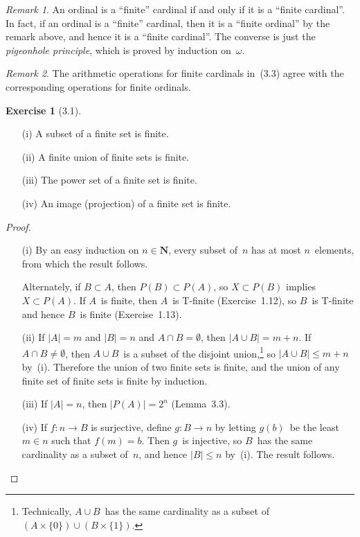 \documentclass[letterpaper,12pt]{article}
\newcommand{\N}{\boldsymbol{N}}
\renewcommand{\P}{P}
\newcommand{\union}{\cup}
\newcommand{\sect}{\cap}
\newcommand{\card}[1]{|#1|}
\theoremstyle{definition}
\newtheorem*{exer}{Exercise}
\theoremstyle{remark}
\newtheorem*{rmk}{Remark}
\begin{document}
\begin{rmk}
An ordinal is a ``finite'' cardinal if and only if it is a ``finite cardinal''. In fact, if an ordinal is a ``finite'' cardinal, then it is a ``finite ordinal'' by the remark above, and hence it is a ``finite cardinal''. The converse is just the \emph{pigeonhole principle}, which is proved by induction on~\(\omega\).
\end{rmk}

\begin{rmk}
The arithmetic operations for finite cardinals in~(3.3) agree with the corresponding operations for finite ordinals.
\end{rmk}

\begin{exer}[3.1]\
\begin{enumerate}[itemsep=0pt]
\item[(i)] A subset of a finite set is finite.
\item[(ii)] A finite union of finite sets is finite.
\item[(iii)] The power set of a finite set is finite.
\item[(iv)] An image (projection) of a finite set is finite.
\end{enumerate}
\end{exer}
\begin{proof}\
\begin{enumerate}[itemsep=0pt]
\item[(i)] By an easy induction on \(n\in\N\), every subset of~\(n\) has at most \(n\)~elements, from which the result follows.

Alternately, if \(B\subset A\), then \(\P(B)\subset\P(A)\), so \(X\subset\P(B)\) implies \(X\subset\P(A)\). If \(A\)~is finite, then \(A\)~is T-finite (Exercise~1.12), so \(B\)~is T-finite and hence \(B\)~is finite (Exercise~1.13).
\item[(ii)] If \(\card{A}=m\) and \(\card{B}=n\) and \(A\sect B=\emptyset\), then \(\card{A\union B}=m+n\). If \(A\sect B\ne\emptyset\), then \(A\union B\)~is a subset of the disjoint union,\footnote{Technically, \(A\union B\)~has the same cardinality as a subset of \((A\times\{0\})\union(B\times\{1\})\).} so \(\card{A\union B}\le m+n\) by~(i). Therefore the union of two finite sets is finite, and the union of any finite set of finite sets is finite by induction.
\item[(iii)] If \(\card{A}=n\), then \(\card{\P(A)}=2^n\) (Lemma~3.3).
\item[(iv)] If \(f:n\to B\) is surjective, define \(g:B\to n\) by letting \(g(b)\)~be the least \(m\in n\) such that \(f(m)=b\). Then \(g\)~is injective, so \(B\)~has the same cardinality as a subset of~\(n\), and hence \(\card{B}\le n\) by~(i). The result follows.\qedhere
\end{enumerate}
\end{proof}
\end{document}
